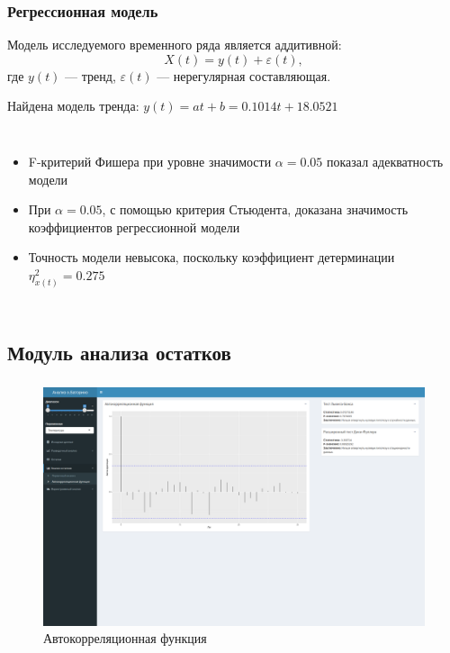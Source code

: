 \documentclass[notheorems]{beamer}
\theoremstyle{definition}
\theoremstyle{example}
\theoremstyle{plain}
\begin{document}
\begin{frame}
  \frametitle{Регрессионная модель}
  Модель исследуемого временного ряда является аддитивной:
  \begin{equation}
    X(t) = y(t) + \varepsilon(t),
  \end{equation}
  где $ y(t) $ --- тренд, $ \varepsilon(t) $ --- нерегулярная составляющая.

  \vspace{0.2em}

  \begin{center}
    Найдена модель тренда: $ y(t) = at + b = 0.1014t + 18.0521 $
  \end{center}
  \begin{columns}[c]
  {\footnotesize
  \begin{itemize}
    \item F-критерий Фишера при уровне значимости $ \alpha = 0.05 $ показал адекватность модели
    \item При $ \alpha=0.05 $, с помощью критерия Стьюдента, доказана значимость коэффициентов регрессионной модели
    \item Точность модели невысока, поскольку коэффициент детерминации $ \eta^2_{x(t)} = 0.275 $
  \end{itemize}
  }
  {\footnotesize
  
  }
  \end{columns}
\end{frame}

\subsection{Модуль анализа остатков}

\begin{frame}
  \frametitle{\large\secname}
  \framesubtitle{\subsecname}
    \begin{figure}[h]
    \includegraphics[width=1\textwidth]{../../figures/static/3_acf.png}
    \caption{Автокорреляционная функция}
  \end{figure}
\end{frame}
\end{document}
